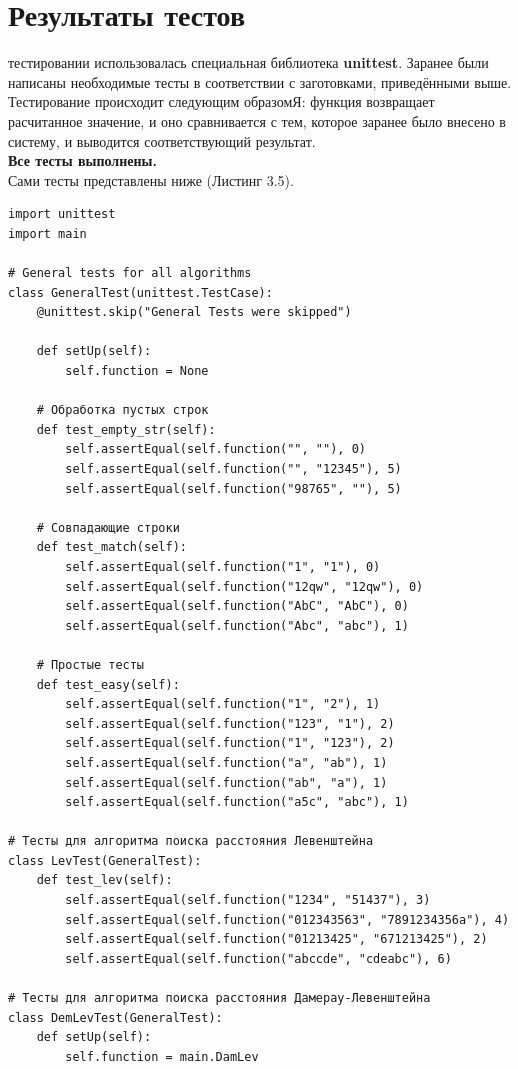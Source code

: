 \documentclass[12pt]{report}
\begin{document}
\section{Результаты тестов}
 тестировании использовалась специальная библиотека \textbf{unittest}. Заранее были написаны необходимые тесты в соответствии с заготовками, приведёнными выше. Тестирование происходит следующим образомЯ: функция возвращает расчитанное значение, и оно сравнивается с тем, которое заранее было внесено в систему, и выводится соответствующий результат.\\

\textbf{Все тесты выполнены.}\\

Сами тесты представлены ниже (Листинг 3.5).
\begin{lstlisting}[label=some-code, caption = Тесты]
import unittest
import main
	
# General tests for all algorithms
class GeneralTest(unittest.TestCase):
	@unittest.skip("General Tests were skipped")
	
	def setUp(self):
		self.function = None
	
	# Обработка пустых строк
	def test_empty_str(self):
		self.assertEqual(self.function("", ""), 0)
		self.assertEqual(self.function("", "12345"), 5)
		self.assertEqual(self.function("98765", ""), 5)
	
    # Совпадающие строки
	def test_match(self):
		self.assertEqual(self.function("1", "1"), 0)
		self.assertEqual(self.function("12qw", "12qw"), 0)
		self.assertEqual(self.function("AbC", "AbC"), 0)
		self.assertEqual(self.function("Abc", "abc"), 1)
	
	# Простые тесты
	def test_easy(self):
		self.assertEqual(self.function("1", "2"), 1)
		self.assertEqual(self.function("123", "1"), 2)
		self.assertEqual(self.function("1", "123"), 2)
		self.assertEqual(self.function("a", "ab"), 1)
		self.assertEqual(self.function("ab", "a"), 1)
		self.assertEqual(self.function("a5c", "abc"), 1)
	
# Тесты для алгоритма поиска расстояния Левенштейна
class LevTest(GeneralTest):
	def test_lev(self):
		self.assertEqual(self.function("1234", "51437"), 3)
		self.assertEqual(self.function("012343563", "7891234356a"), 4)
		self.assertEqual(self.function("01213425", "671213425"), 2)
		self.assertEqual(self.function("abccde", "cdeabc"), 6)
	
# Тесты для алгоритма поиска расстояния Дамерау-Левенштейна
class DemLevTest(GeneralTest):
	def setUp(self):
		self.function = main.DamLev
	

\end{lstlisting}
\end{document}
